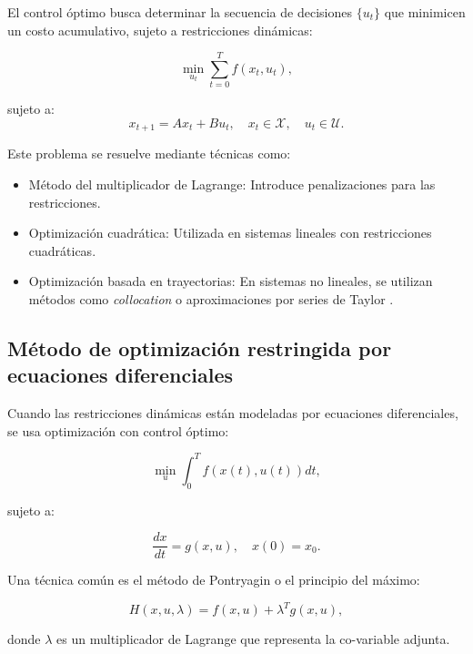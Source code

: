 \begin{itemize}
		El control óptimo busca determinar la secuencia de decisiones \( \{u_t\} \) que minimicen un costo acumulativo, sujeto a restricciones dinámicas:
		
		\begin{equation}
			\min_{u_t} \sum_{t=0}^{T} f(x_t, u_t),
		\end{equation}
		
		sujeto a:
		\begin{equation}
			x_{t+1} = Ax_t + Bu_t, \quad x_t \in \mathcal{X}, \quad u_t \in \mathcal{U}.
		\end{equation}
		
		Este problema se resuelve mediante técnicas como:
		\begin{itemize}
			\item Método del multiplicador de Lagrange: Introduce penalizaciones para las restricciones.
			\item Optimización cuadrática: Utilizada en sistemas lineales con restricciones cuadráticas.
			\item Optimización basada en trayectorias: En sistemas no lineales, se utilizan métodos como \textit{collocation} o aproximaciones por series de Taylor \cite{rao2009survey}.
		\end{itemize}
		
		\subsection{Método de optimización restringida por ecuaciones diferenciales}
		
		Cuando las restricciones dinámicas están modeladas por ecuaciones diferenciales, se usa optimización con control óptimo:
		
		\begin{equation}
			\min_u \int_{0}^{T} f(x(t), u(t)) dt,
		\end{equation}
		
		sujeto a:
		
		\begin{equation}
			\frac{dx}{dt} = g(x, u), \quad x(0) = x_0.
		\end{equation}
		
		Una técnica común es el método de Pontryagin o el principio del máximo:
		
		\begin{equation}
			H(x, u, \lambda) = f(x, u) + \lambda^T g(x, u),
		\end{equation}
		
		donde \( \lambda \) es un multiplicador de Lagrange que representa la co-variable adjunta.
		

\end{itemize}
